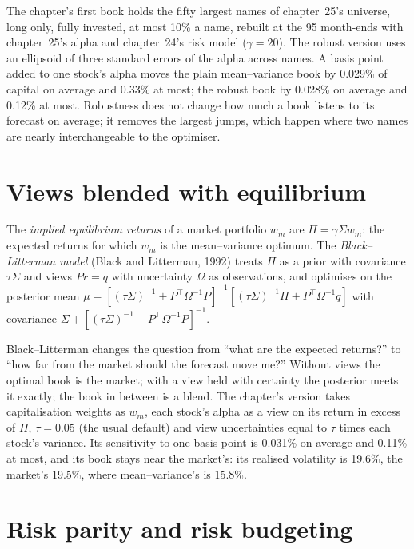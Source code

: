 The chapter's first book holds the fifty largest names of chapter~25's universe, long only, fully invested, at most 10\% a name, rebuilt at the 95
month-ends with chapter~25's alpha and chapter~24's risk model ($\gamma = 20$). The robust version uses an ellipsoid of three standard errors of the alpha
across names. A basis point added to one stock's alpha moves the plain mean--variance book by 0.029\% of capital on average and 0.33\% at most; the robust
book by 0.028\% on average and 0.12\% at most. Robustness does not change how much a book listens to its forecast on average; it removes the largest jumps,
which happen where two names are nearly interchangeable to the optimiser.

\section{Views blended with equilibrium}

\begin{definition}\label{def:rs:portfolio-construction-ii:bl}
The \emph{implied equilibrium returns} of a market portfolio $w_m$ are $\Pi = \gamma\Sigma w_m$: the expected returns for
which $w_m$ is the mean--variance optimum. The \emph{Black--Litterman model} (Black and Litterman, 1992) treats $\Pi$ as a prior
with covariance $\tau\Sigma$ and views $Pr = q$ with uncertainty $\Omega$ as observations, and optimises on the posterior mean
$\mu = [(\tau\Sigma)^{-1} + P^\top\Omega^{-1}P]^{-1}[(\tau\Sigma)^{-1}\Pi + P^\top\Omega^{-1}q]$ with covariance $\Sigma + [(\tau\Sigma)^{-1} + P^\top\Omega^{-1}P]^{-1}$.
\end{definition}

Black--Litterman changes the question from ``what are the expected returns?'' to ``how far from the market should the forecast move me?'' Without views the
optimal book is the market; with a view held with certainty the posterior meets it exactly; the book in between is a blend. The chapter's version takes
capitalisation weights as $w_m$, each stock's alpha as a view on its return in excess of $\Pi$, $\tau = 0.05$ (the usual default) and view uncertainties equal to
$\tau$ times each stock's variance. Its sensitivity to one basis point is 0.031\% on average and 0.11\% at most, and its book stays near the market's: its
realised volatility is 19.6\%, the market's 19.5\%, where mean--variance's is 15.8\%.

\section{Risk parity and risk budgeting}


